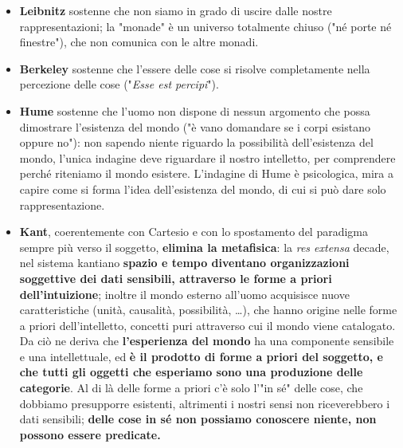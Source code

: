 \begin{itemize}
	\item \textbf{Leibnitz} sostenne che non siamo in grado di uscire dalle nostre rappresentazioni; la "monade" è un universo totalmente chiuso ("né porte né finestre"), che non comunica con le altre monadi.
	\item \textbf{Berkeley} sostenne che l'essere delle cose si risolve completamente nella percezione delle cose ("\textit{Esse est percipi}").
	\item \textbf{Hume} sostenne che l'uomo non dispone di nessun argomento che possa dimostrare l'esistenza del mondo ("è vano domandare se i corpi esistano oppure no"): non sapendo niente riguardo la possibilità dell'esistenza del mondo, l'unica indagine deve riguardare il nostro intelletto, per comprendere perché riteniamo il mondo esistere. L'indagine di Hume è psicologica, mira a capire come si forma l'idea dell'esistenza del mondo, di cui si può dare solo rappresentazione.
	\item \textbf{Kant}, coerentemente con Cartesio e con lo spostamento del paradigma sempre più verso il soggetto, \textbf{elimina la metafisica}: la \textit{res extensa} decade, nel sistema kantiano \textbf{spazio e tempo diventano organizzazioni soggettive dei dati sensibili, attraverso le forme a priori dell'intuizione}; inoltre il mondo esterno all'uomo acquisisce nuove caratteristiche (unità, causalità, possibilità, \dots), che hanno origine nelle forme a priori dell'intelletto, concetti puri attraverso cui il mondo viene catalogato. Da ciò ne deriva che \textbf{l'esperienza del mondo} ha una componente sensibile e una intellettuale, ed \textbf{è il prodotto di forme a priori del soggetto, e che tutti gli oggetti che esperiamo sono una produzione delle categorie}. Al di là delle forme a priori c'è solo l'"in sé" delle cose, che dobbiamo presupporre esistenti, altrimenti i nostri sensi non riceverebbero i dati sensibili; \textbf{delle cose in sé non possiamo conoscere niente, non possono essere predicate.}
\end{itemize}

